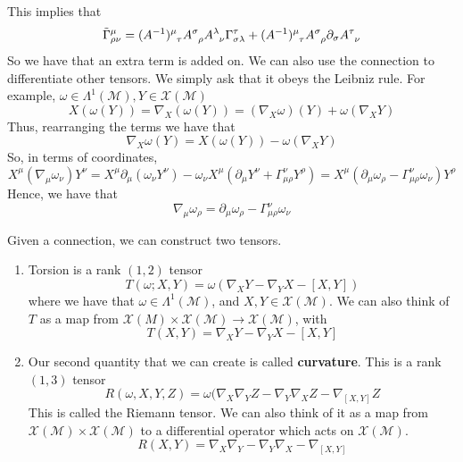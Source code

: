 This implies that 
\[
	\tilde{ \Gamma } ^ \mu _{ \rho \nu }  = ( A ^{ -1 } ) \indices{ ^ \mu _ \tau } A \indices{ ^ \sigma _ \rho } A \indices{ ^ \lambda _ \nu } \Gamma ^ \tau _{ \sigma \lambda } + ( A ^{ -1 } ) \indices{ ^ \mu _ \tau } A \indices{ ^ \sigma _ \rho } \partial  _ \sigma A \indices{ ^ \tau _ \nu }       
\]  So we have that an extra term is added on. 
We can also use the connection to differentiate 
other tensors. 
We simply ask that it obeys the Leibniz rule. 
For example, $ \omega \in \Lambda ^ 1 ( \mathcal{ M } ) , Y \in \mathcal{ X } ( \mathcal{ M } ) $ 
\[
	X ( \omega ( Y ) ) = \nabla _ X ( \omega ( Y ) )  = ( \nabla _ X \omega ) ( Y ) + \omega ( \nabla _ X Y ) 
\] Thus, rearranging the terms we have that 
\[
	\nabla _ X \omega ( Y )  = X ( \omega ( Y ) ) - \omega ( \nabla _ X Y ) 
\] So, in terms of coordinates, 
\[
	X^ \mu ( \nabla _ \mu \omega _ \nu ) Y ^ \nu = X^ \mu \partial  _ \mu ( \omega  _\nu Y ^ \nu ) - \omega _ \nu X^ \mu ( \partial  _ \mu Y ^ \nu + \Gamma ^ \nu _{ \mu \rho } Y ^ \rho )  = X ^ \mu ( \partial  _ \mu \omega _ \rho - \Gamma ^ \nu _{ \mu \rho } \omega _ \nu ) Y ^ \rho 
\] Hence, we have that 
\[
 \nabla _ \mu \omega _ \rho  = \partial  _ \mu \omega _ \rho  - \Gamma ^ \nu _{ \mu \rho } \omega _ \nu 
\]  %

Given a connection, we can construct two tensors. 
\begin{enumerate}
	\item Torsion is a rank $(1, 2) $ tensor
		\[
			T ( \omega; X, Y )  = \omega ( \nabla _ X Y - \nabla _ Y X - [ X, Y ] ) 
		\] where we have that $ \omega \in \Lambda^ 1 ( \mathcal{ M } ) $, 
		and $ X, Y \in \mathcal{ X } ( \mathcal{ M } ) $. 
		We can also think of $ T $ as a map from 
		$ \mathcal{ X } ( M ) \times \mathcal{ X } ( \mathcal{ M } ) \to \mathcal{ X } ( \mathcal{ M } ) $, with 
		\[
			T ( X, Y ) = \nabla _ X Y - \nabla _ Y X - [ X, Y ] 
		\] 
	\item Our second quantity that we can create is called \textbf{curvature}. 
		This is a rank $ ( 1, 3 )  $  tensor
		\[
			R ( \omega, X, Y , Z ) = \omega ( \nabla _ X \nabla  _ Y Z - \nabla _ Y \nabla  _ X Z - \nabla _{ [ X, Y ]  } Z 
		\] This is called the Riemann tensor. We can 
		also think of it as a map from $ \mathcal{ X  } ( \mathcal{ M } ) \times \mathcal{ X } ( \mathcal{ M } ) $ to a differential operator which 
		acts on $\mathcal{ X } ( \mathcal{ M } ) $. 
		\[
			R( X, Y ) = \nabla _ X \nabla  _ Y - \nabla  _ Y \nabla  _ X - \nabla _{ [ X, Y ] }
		\] 
\end{enumerate}

